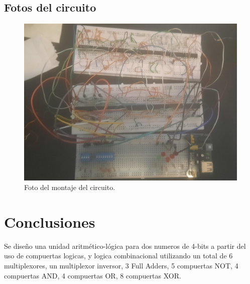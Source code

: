\documentclass[journal, table]{IEEEtran}
\begin{document}
\subsection{Fotos del circuito}
\begin{figure}[H]
    \centering
    \includegraphics[width=\linewidth]{./Images/WhatsApp Image 2024-05-11 at 18.46.47.jpeg}
    \caption{Foto del montaje del circuito.}
    \label{fig:photo}
\end{figure}

\section{Conclusiones}
Se diseño una unidad aritmético-lógica para dos numeros de 4-bits a partir del
uso de compuertas logicas, y logica combinacional utilizando un total de 6
multiplexores, un multiplexor inversor, 3 Full Adders, 5 compuertas NOT,
4 compuertas AND, 4 compuertas OR, 8 compuertas XOR.

\printbibliography
\nocite{*}
\end{document}
